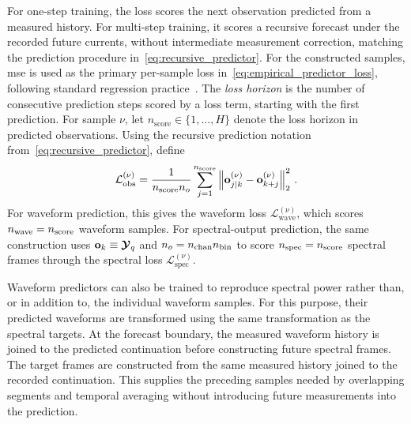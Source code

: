 For one-step training, the loss scores the next observation predicted from a measured history.
For multi-step training, it scores a recursive forecast under the recorded future currents, without intermediate measurement correction, matching the prediction procedure in~\eqref{eq:recursive_predictor}.
For the constructed samples, \ac{mse} is used as the primary per-sample loss in~\eqref{eq:empirical_predictor_loss}, following standard regression practice~\cite{Goodfellow2016}.
The \emph{loss horizon} is the number of consecutive prediction steps scored by a loss term, starting with the first prediction.
For sample $\nu$, let $n_{\mathrm{score}}\in\{1,\ldots,H\}$ denote the loss horizon in predicted observations.
Using the recursive prediction notation from~\eqref{eq:recursive_predictor}, define
\begin{equation}
    \mathcal{L}_\mathrm{obs}^{(\nu)}
    = \frac{1}{n_{\mathrm{score}} n_{o}}
    \sum_{j=1}^{n_{\mathrm{score}}}
    \left\|
        \mathbf{o}^{(\nu)}_{j|k}
        -\mathbf{o}^{(\nu)}_{k+j}
    \right\|_2^2\,.
    \label{eq:observable_training_loss}
\end{equation}
For waveform prediction, this gives the waveform loss $\mathcal{L}_\mathrm{wave}^{(\nu)}$, which scores $n_{\mathrm{wave}}=n_{\mathrm{score}}$ waveform samples.
For spectral-output prediction, the same construction uses $\mathbf{o}_k\equiv\boldsymbol{\mathcal{Y}}{}_q$ and $n_{o}=n_{\mathrm{chan}}{} n_{\mathrm{bin}}{}$ to score $n_{\mathrm{spec}}=n_{\mathrm{score}}$ spectral frames through the spectral loss $\mathcal{L}_\mathrm{spec}^{(\nu)}$.

Waveform predictors can also be trained to reproduce spectral power rather than, or in addition to, the individual waveform samples.
For this purpose, their predicted waveforms are transformed using the same transformation as the spectral targets.
At the forecast boundary, the measured waveform history is joined to the predicted continuation before constructing future spectral frames.
The target frames are constructed from the same measured history joined to the recorded continuation.
This supplies the preceding samples needed by overlapping segments and temporal averaging without introducing future measurements into the prediction.

